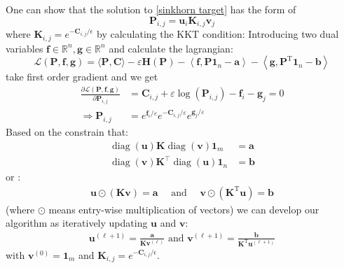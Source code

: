 \documentclass{article}
\begin{document}
One can show that the solution to \ref{sinkhorn target} has the form of 
\begin{equation}
\mathbf { P } _ { i , j } = \mathbf { u } _ { i } \mathbf { K } _ { i , j } \mathbf { v } _ { j }
\end{equation}
where $\mathbf { K } _ { i , j } = e^{-\mathbf{C}_{i,j}/\epsilon}$ by calculating the KKT condition:
Introducing two dual variables $\mathbf { f } \in \mathbb { R } ^ { n } , \mathbf { g } \in \mathbb { R } ^ { n }$ and calculate the lagrangian:
\begin{equation}
\mathcal { L } ( \mathbf { P } , \mathbf { f } , \mathbf { g } ) = \langle \mathbf { P } , \mathbf { C } \rangle - \varepsilon \mathbf { H } ( \mathbf { P } ) - \left\langle \mathbf { f } , \mathbf { P } \mathbf { 1 } _ { n } - \mathbf { a } \right\rangle - \left\langle \mathbf { g } , \mathbf { P } ^ { \mathrm { T } } \mathbf{ 1 } _ { n } - \mathbf { b } \right\rangle
\end{equation}
take first order gradient and we get
\begin{align}
\frac { \partial \mathcal { L } ( \mathbf { P } , \mathbf { f } , \mathbf { g } ) } { \partial \mathbf { P } _ { i , j } } &= \mathbf { C } _ { i , j } + \varepsilon \log \left( \mathbf { P } _ { i , j } \right) - \mathbf { f } _ { i } - \mathbf { g } _ { j } = 0\\
\Rightarrow\mathbf { P } _ { i , j } &= e ^ { \mathbf { f } _ { i } / \varepsilon } e ^ { - \mathbf { C } _ { i , j } / \varepsilon } e ^ { \mathbf { g } _ { j } / \varepsilon }
\end{align}
Based on the constrain that:
\begin{align}
\operatorname { diag } ( \mathbf { u } ) \mathbf { K } \operatorname { diag } ( \mathbf { v } ) \mathbf { 1 } _ { m } &= \mathbf { a }\\
\operatorname { diag } ( \mathbf { v } ) \mathbf { K } ^ { \top } \operatorname { diag } ( \mathbf { u } ) \mathbf { 1 } _ { n } &= \mathbf { b }
\end{align}
or :
\begin{align}
\mathbf { u } \odot ( \mathbf { K } \mathbf { v } ) = \mathbf { a } \quad \text { and } \quad \mathbf { v } \odot \left( \mathbf { K } ^ { \mathrm { T } } \mathbf { u } \right) = \mathbf { b }
\end{align}
(where $\odot$ means entry-wise multiplication of vectors) we can develop our algorithm as iteratively updating $\mathbf { u }$ and $\mathbf { v }$:
\begin{align}
\mathbf { u } ^ { ( \ell + 1 ) }  { = } \frac { \mathbf { a } } { \mathbf { K } \mathbf { v } ^ { ( \ell ) } } \text { and } \mathbf { v } ^ { ( \ell + 1 ) } { = } \frac { \mathbf { b } } { \mathbf { K } ^ { \mathrm { T } } \mathbf { u } ^ { ( \ell + 1 ) } }
\end{align}
with $\mathbf { v } ^ { ( 0 ) } = \mathbf { 1 } _ { m }$ and $\mathbf { K } _ { i , j } = e^{-\mathbf{C}_{i,j}/\epsilon}$.
\end{document}
